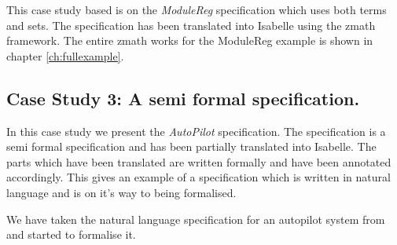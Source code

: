 This case study based is on the \emph{ModuleReg} specification which uses both terms and sets. The specification has been translated into Isabelle using the \gls{zmath} framework. The entire \gls{zmath} works for the ModuleReg example is shown in chapter \ref{ch:fullexample}.

\subsection{Case Study 3: A semi formal specification.}

In this case study we present the \emph{AutoPilot} specification. The specification is a semi formal specification and has been partially translated into Isabelle. The parts which have been translated are written formally and have been annotated accordingly. This gives an example of a specification which is written in natural language and is on it's way to being formalised.

We have taken the natural language specification for an autopilot system from \cite{Butler96} and started to formalise it.

